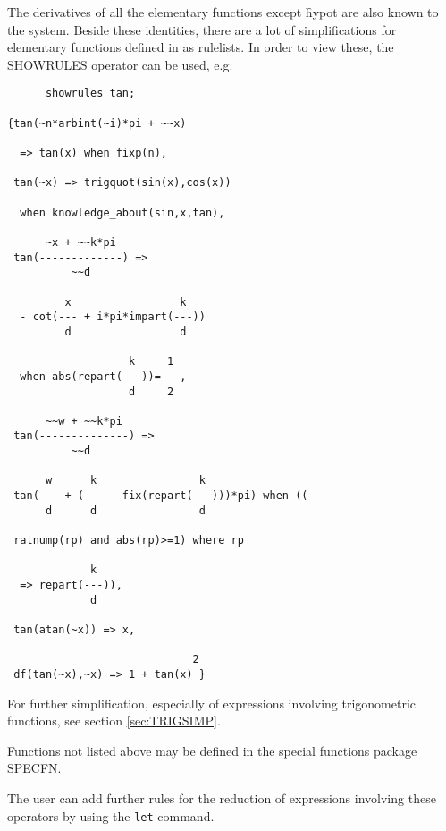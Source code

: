 The derivatives of all the elementary functions except \f{hypot} are
also known to the system.  Beside these identities, there are a lot of
simplifications for elementary functions defined in {\REDUCE} as
rulelists.  In order to view these, the SHOWRULES operator can be
used, e.g.
\begin{verbatim}
      showrules tan;

{tan(~n*arbint(~i)*pi + ~~x)

  => tan(x) when fixp(n),

 tan(~x) => trigquot(sin(x),cos(x))

  when knowledge_about(sin,x,tan),

      ~x + ~~k*pi
 tan(-------------) => 
          ~~d

         x                 k
  - cot(--- + i*pi*impart(---))
         d                 d

                   k     1
  when abs(repart(---))=---,
                   d     2

      ~~w + ~~k*pi
 tan(--------------) => 
          ~~d

      w      k                k
 tan(--- + (--- - fix(repart(---)))*pi) when ((
      d      d                d

 ratnump(rp) and abs(rp)>=1) where rp

             k
  => repart(---)),
             d

 tan(atan(~x)) => x,

                             2
 df(tan(~x),~x) => 1 + tan(x) }
\end{verbatim}
For further simplification, especially of expressions involving
trigonometric functions, see section \ref{sec:TRIGSIMP}.

Functions not listed above may be defined in the special functions
package SPECFN.

The user can add further rules for the reduction of expressions involving
these operators by using the \texttt{let} command.

